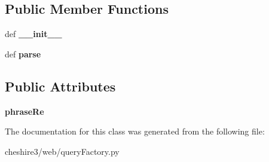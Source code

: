 \subsection*{Public Member Functions}
\begin{DoxyCompactItemize}
\item 
\hypertarget{classcheshire3_1_1web_1_1query_factory_1_1_field_storage_query_stream_a7410883b908874bf4fadd2720ac4ed76}{def {\bfseries \-\_\-\-\_\-init\-\_\-\-\_\-}}\label{classcheshire3_1_1web_1_1query_factory_1_1_field_storage_query_stream_a7410883b908874bf4fadd2720ac4ed76}

\item 
\hypertarget{classcheshire3_1_1web_1_1query_factory_1_1_field_storage_query_stream_af13967a8f789f11186eec7c4c90eb4bb}{def {\bfseries parse}}\label{classcheshire3_1_1web_1_1query_factory_1_1_field_storage_query_stream_af13967a8f789f11186eec7c4c90eb4bb}

\end{DoxyCompactItemize}
\subsection*{Public Attributes}
\begin{DoxyCompactItemize}
\item 
\hypertarget{classcheshire3_1_1web_1_1query_factory_1_1_field_storage_query_stream_a01d5c65c0c76520ba9de5ff8bd2e0f92}{{\bfseries phrase\-Re}}\label{classcheshire3_1_1web_1_1query_factory_1_1_field_storage_query_stream_a01d5c65c0c76520ba9de5ff8bd2e0f92}

\end{DoxyCompactItemize}


The documentation for this class was generated from the following file\-:\begin{DoxyCompactItemize}
\item 
cheshire3/web/query\-Factory.\-py\end{DoxyCompactItemize}
